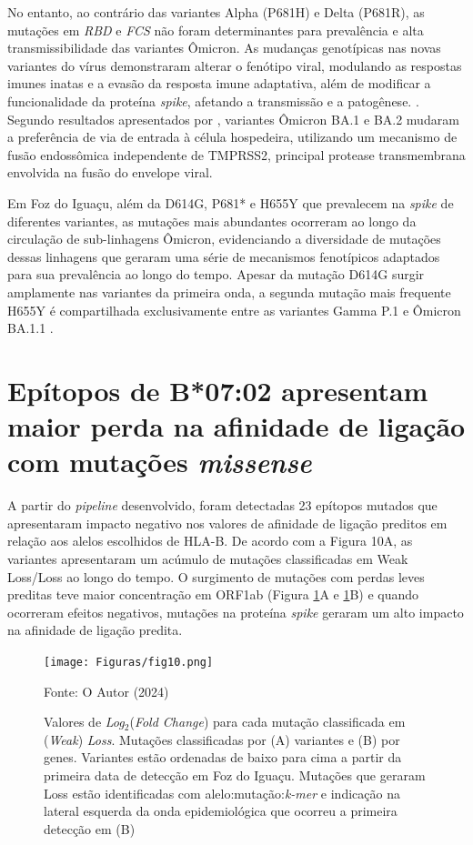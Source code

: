 \begin{justifying}
No entanto, ao contrário das variantes Alpha (P681H) e Delta (P681R), as mutações em \textit{RBD} e \textit{FCS} não foram determinantes para prevalência e alta transmissibilidade das variantes Ômicron. As mudanças genotípicas nas novas variantes do vírus demonstraram alterar o fenótipo viral, modulando as respostas imunes inatas e a evasão da resposta imune adaptativa, além de modificar a funcionalidade da proteína \textit{spike}, afetando a transmissão e a patogênese.  \cite{Harvey:2021, Willett:2022}. Segundo resultados apresentados por , variantes Ômicron BA.1 e BA.2 mudaram a preferência de via de entrada à célula hospedeira, utilizando um mecanismo de fusão endossômica independente de TMPRSS2, principal protease transmembrana envolvida na fusão do envelope viral. 

Em Foz do Iguaçu, além da D614G, P681* e H655Y que prevalecem na \textit{spike} de diferentes variantes, as mutações mais abundantes ocorreram ao longo da circulação de sub-linhagens Ômicron, evidenciando a diversidade de mutações dessas linhagens que geraram uma série de mecanismos fenotípicos adaptados para sua prevalência ao longo do tempo.  Apesar da mutação D614G surgir amplamente nas variantes da primeira onda, a segunda mutação mais frequente H655Y é compartilhada exclusivamente entre as variantes Gamma P.1 e Ômicron BA.1.1 \cite{Ou:2022}.

\section{Epítopos de B*07:02 apresentam  maior perda na afinidade de ligação com mutações \textit{missense}}

A partir do \textit{pipeline} desenvolvido, foram detectadas 23 epítopos mutados que apresentaram impacto negativo nos valores de afinidade de ligação preditos em relação aos alelos escolhidos de HLA-B. De acordo com a Figura 10A, as variantes apresentaram um acúmulo de mutações classificadas em Weak Loss/Loss ao longo do tempo.  O surgimento de mutações com perdas leves preditas teve maior concentração em ORF1ab (Figura \ref{fig:fig10}A e \ref{fig:fig10}B) e quando ocorreram efeitos negativos, mutações na proteína \textit{spike} geraram um alto impacto na afinidade de ligação predita.

\begin{figure}
    \centering
    \caption{\justifying Valores de \textit{Log}$_{2}$(\textit{Fold Change}) para cada mutação classificada em (\textit{Weak}) \textit{Loss}. Mutações classificadas por (A) variantes e (B) por genes. Variantes estão ordenadas de baixo para cima a partir da primeira data de detecção em Foz do Iguaçu. Mutações que geraram Loss estão identificadas com alelo:mutação:\textit{k-mer}  e indicação na lateral esquerda da onda epidemiológica que ocorreu a primeira detecção em (B)}
    \texttt{[image: Figuras/fig10.png]}
    \label{fig:fig10}
    \begin{minipage}{0.8\textwidth} %
        \centering
        \footnotesize Fonte: O Autor (2024)
    \end{minipage}
\end{figure}


\end{justifying}
